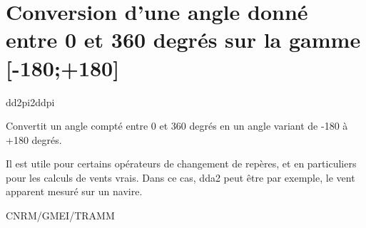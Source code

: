 %
\section{Conversion d'une angle donn\'e entre 0 et 360 degr\'es sur la gamme [-180;+180]}

 {\sf dd2pi2ddpi}

  Convertit un angle compt\'e entre 0 et 360 degr\'es en un angle variant de -180 \`a +180 degr\'es.

\bigskip





Il est utile pour certains op\'erateurs de changement de rep\`eres, et en particuliers pour les calculs de vents vrais.
Dans ce cas, dda2 peut \^etre par exemple, le vent apparent mesur\'e sur un navire.
   
CNRM/GMEI/TRAMM

